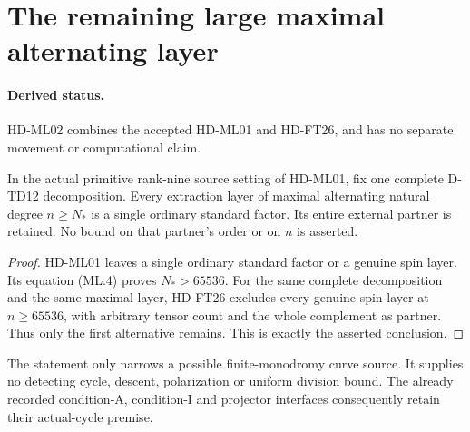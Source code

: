 \section{The remaining large maximal alternating layer}
\label{sec:maximal-alternating-single-standard}

\paragraph{Derived status.}
HD-ML02 combines the accepted HD-ML01 and HD-FT26, and has no
separate movement or computational claim.

\begin{corollary}[HD-ML02]
In the actual primitive rank-nine source setting of HD-ML01, fix one
complete D-TD12 decomposition. Every extraction layer of maximal
alternating natural degree $n\ge N_*$ is a single ordinary standard
factor. Its entire external partner is retained. No bound on that
partner's order or on $n$ is asserted.
\end{corollary}

\begin{proof}
HD-ML01 leaves a single ordinary standard factor or a genuine spin
layer. Its equation (ML.4) proves $N_*>65536$. For the same complete
decomposition and the same maximal layer, HD-FT26 excludes every
genuine spin layer at $n\ge65536$, with arbitrary tensor count and
the whole complement as partner. Thus only the first alternative
remains. This is exactly the asserted conclusion.
\end{proof}

The statement only narrows a possible finite-monodromy curve source.
It supplies no detecting cycle, descent, polarization or uniform
division bound. The already recorded condition-A, condition-I and
projector interfaces consequently retain their actual-cycle premise.
